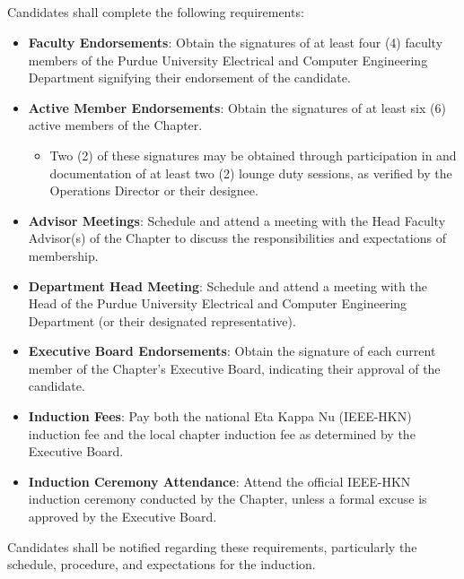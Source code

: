 \documentclass[10pt, oneside]{article}
\begin{document}
\subsection{ }
Candidates shall complete the following requirements:
\begin{itemize}
    \item \textbf{Faculty Endorsements}: Obtain the signatures of at least four (4) faculty members of the Purdue University Electrical and Computer Engineering Department signifying their endorsement of the candidate.
    \item \textbf{Active Member Endorsements}: Obtain the signatures of at least six (6) active members of the Chapter.
    \begin{itemize}
        \item Two (2) of these signatures may be obtained through participation in and documentation of at least two (2) lounge duty sessions, as verified by the Operations Director or their designee.
    \end{itemize}
    \item \textbf{Advisor Meetings}: Schedule and attend a meeting with the Head Faculty Advisor(s) of the Chapter to discuss the responsibilities and expectations of membership.
    \item \textbf{Department Head Meeting}: Schedule and attend a meeting with the Head of the Purdue University Electrical and Computer Engineering Department (or their designated representative).
    \item \textbf{Executive Board Endorsements}: Obtain the signature of each current member of the Chapter's Executive Board, indicating their approval of the candidate.
    \item \textbf{Induction Fees}: Pay both the national Eta Kappa Nu (IEEE-HKN) induction fee and the local chapter induction fee as determined by the Executive Board.
    \item \textbf{Induction Ceremony Attendance}: Attend the official IEEE-HKN induction ceremony conducted by the Chapter, unless a formal excuse is approved by the Executive Board.
\end{itemize}
Candidates shall be notified regarding these requirements, particularly the schedule, procedure, and expectations for the induction.

\subsection{}
\end{document}
